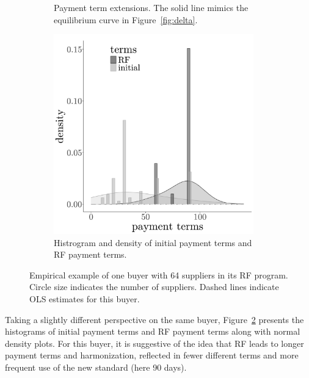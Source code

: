 \documentclass[a4paper,11pt]{article}
\renewcommand{\~}[1]{\tilde{#1}}
\renewcommand{\-}[1]{\overline{#1}}
\begin{document}
\begin{figure}[tb]
\begin{subfigure}[b]{0.31\textwidth}
         \caption{Payment term extensions. The solid line mimics the equilibrium curve in Figure~\ref{fig:delta}. \vspace{18pt}}
         \label{fig:23:extension}
     \end{subfigure}\hfill
     \begin{subfigure}[b]{0.31\textwidth}
         \centering
         \includegraphics[width=0.95\textwidth]{figures/hist.pt.png}
         \caption{Histrogram and density of initial payment terms and RF payment terms.\vspace{18pt}}
         \label{fig:hist}
     \end{subfigure}
        \caption{Empirical example of one buyer with 64 suppliers in its RF program. Circle size indicates the number of suppliers. Dashed lines indicate OLS estimates for this buyer.}
        \label{fig:23:zones}        
\end{figure}
\newpage
Taking a slightly different perspective on the same buyer, Figure~\ref{fig:hist} presents the histograms of initial payment terms and RF payment terms along with normal density plots. For this buyer, it is suggestive of the idea that RF leads to longer payment terms and harmonization, reflected in fewer different terms and more frequent use of the new standard (here 90 days).
 
\end{document}
